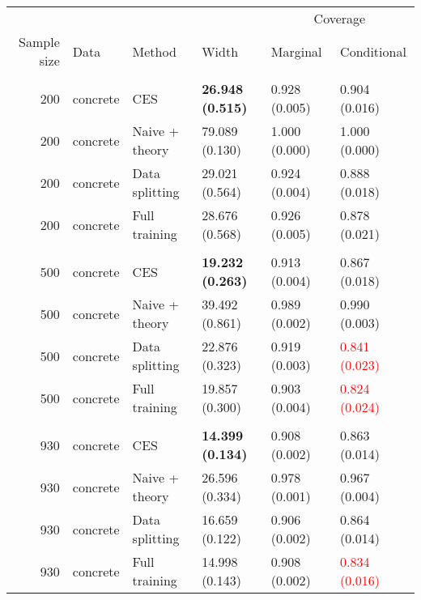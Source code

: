 
\begin{tabular}{rlllll}
\toprule
\multicolumn{4}{c}{ } & \multicolumn{2}{c}{Coverage} \\
\cmidrule(l{3pt}r{3pt}){5-6}
Sample size & Data & Method & Width & Marginal & Conditional\\
\midrule
\addlinespace[0.3em]
\multicolumn{6}{l}{\textbf{200}}\\
\hspace{1em}200 & concrete & CES & \textbf{26.948 (0.515)} & 0.928 (0.005) & 0.904 (0.016)\\
\hspace{1em}200 & concrete & Naive + theory & 79.089 (0.130) & 1.000 (0.000) & 1.000 (0.000)\\
\hspace{1em}200 & concrete & Data splitting & 29.021 (0.564) & 0.924 (0.004) & 0.888 (0.018)\\
\hspace{1em}200 & concrete & Full training & 28.676 (0.568) & 0.926 (0.005) & 0.878 (0.021)\\
\addlinespace[0.3em]
\multicolumn{6}{l}{\textbf{500}}\\
\hspace{1em}500 & concrete & CES & \textbf{19.232 (0.263)} & 0.913 (0.004) & 0.867 (0.018)\\
\hspace{1em}500 & concrete & Naive + theory & 39.492 (0.861) & 0.989 (0.002) & 0.990 (0.003)\\
\hspace{1em}500 & concrete & Data splitting & 22.876 (0.323) & 0.919 (0.003) & \textcolor{red}{0.841 (0.023)}\\
\hspace{1em}500 & concrete & Full training & 19.857 (0.300) & 0.903 (0.004) & \textcolor{red}{0.824 (0.024)}\\
\addlinespace[0.3em]
\multicolumn{6}{l}{\textbf{930}}\\
\hspace{1em}930 & concrete & CES & \textbf{14.399 (0.134)} & 0.908 (0.002) & 0.863 (0.014)\\
\hspace{1em}930 & concrete & Naive + theory & 26.596 (0.334) & 0.978 (0.001) & 0.967 (0.004)\\
\hspace{1em}930 & concrete & Data splitting & 16.659 (0.122) & 0.906 (0.002) & 0.864 (0.014)\\
\hspace{1em}930 & concrete & Full training & 14.998 (0.143) & 0.908 (0.002) & \textcolor{red}{0.834 (0.016)}\\
\bottomrule
\end{tabular}
